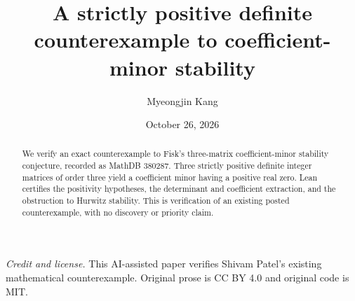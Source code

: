 \documentclass[11pt]{article}
\title{A strictly positive definite counterexample to coefficient-minor stability}
\author{Myeongjin Kang}
\date{October 26, 2026}
\begin{document}
\maketitle
\begin{abstract}
We verify an exact counterexample to Fisk's three-matrix coefficient-minor stability conjecture, recorded as MathDB 380287. Three strictly positive definite integer matrices of order three yield a coefficient minor having a positive real zero. Lean certifies the positivity hypotheses, the determinant and coefficient extraction, and the obstruction to Hurwitz stability. This is verification of an existing posted counterexample, with no discovery or priority claim.
\end{abstract}
\noindent\textit{Credit and license.} This AI-assisted paper verifies Shivam Patel's existing mathematical counterexample. Original prose is CC BY 4.0 and original code is MIT.
\end{document}
